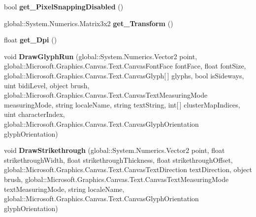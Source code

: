 \begin{DoxyCompactItemize}
\item 
\mbox{\label{interface_microsoft_1_1_graphics_1_1_canvas_1_1_text_1_1_i_canvas_text_renderer_a47f1c1f5b81a4b3e71ddf01f64d0e1e9}} 
bool {\bfseries get\+\_\+\+Pixel\+Snapping\+Disabled} ()
\item 
\mbox{\label{interface_microsoft_1_1_graphics_1_1_canvas_1_1_text_1_1_i_canvas_text_renderer_a7a6a6deb82895cb39ac5fd578ed86cfd}} 
global\+::\+System.\+Numerics.\+Matrix3x2 {\bfseries get\+\_\+\+Transform} ()
\item 
\mbox{\label{interface_microsoft_1_1_graphics_1_1_canvas_1_1_text_1_1_i_canvas_text_renderer_a6dde43e44cf9d35e89b72e336e4aa41c}} 
float {\bfseries get\+\_\+\+Dpi} ()
\item 
\mbox{\label{interface_microsoft_1_1_graphics_1_1_canvas_1_1_text_1_1_i_canvas_text_renderer_a251cf38ca7077b36bbfacf617f946c68}} 
void {\bfseries Draw\+Glyph\+Run} (global\+::\+System.\+Numerics.\+Vector2 point, global\+::\+Microsoft.\+Graphics.\+Canvas.\+Text.\+Canvas\+Font\+Face font\+Face, float font\+Size, global\+::\+Microsoft.\+Graphics.\+Canvas.\+Text.\+Canvas\+Glyph\mbox{[}$\,$\mbox{]} glyphs, bool is\+Sideways, uint bidi\+Level, object brush, global\+::\+Microsoft.\+Graphics.\+Canvas.\+Text.\+Canvas\+Text\+Measuring\+Mode measuring\+Mode, string locale\+Name, string text\+String, int\mbox{[}$\,$\mbox{]} cluster\+Map\+Indices, uint character\+Index, global\+::\+Microsoft.\+Graphics.\+Canvas.\+Text.\+Canvas\+Glyph\+Orientation glyph\+Orientation)
\item 
\mbox{\label{interface_microsoft_1_1_graphics_1_1_canvas_1_1_text_1_1_i_canvas_text_renderer_a554332d1d991fdd8a01a27fe4b6ce0d0}} 
void {\bfseries Draw\+Strikethrough} (global\+::\+System.\+Numerics.\+Vector2 point, float strikethrough\+Width, float strikethrough\+Thickness, float strikethrough\+Offset, global\+::\+Microsoft.\+Graphics.\+Canvas.\+Text.\+Canvas\+Text\+Direction text\+Direction, object brush, global\+::\+Microsoft.\+Graphics.\+Canvas.\+Text.\+Canvas\+Text\+Measuring\+Mode text\+Measuring\+Mode, string locale\+Name, global\+::\+Microsoft.\+Graphics.\+Canvas.\+Text.\+Canvas\+Glyph\+Orientation glyph\+Orientation)

\end{DoxyCompactItemize}
